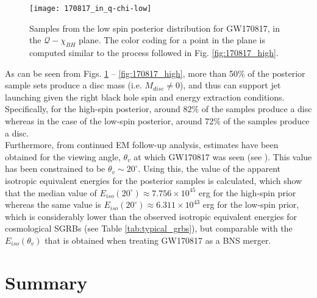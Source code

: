         \begin{figure}[ht]
            \centering
            \texttt{[image: 170817\_in\_q-chi-low]}
            \caption[$M_{disc}$ for GW170817's Low Spin Posterior Distribution]
            {
                Samples from the low spin posterior distribution for GW170817, in the
                $\mathcal{Q}-\chi_{BH}$ plane. The color coding for a point in the plane
                is computed similar to the process followed in Fig.
                \ref{fig:170817_high}.
            }
            \label{fig:170817_low}
        \end{figure}

    As can be seen from Figs. \ref{fig:170817_low} -- \ref{fig:170817_high}, more than
    50\% of the posterior sample sets produce a disc mass (i.e. $M_{disc} \neq 0$), and
    thus can support jet launching given the right black hole spin and energy extraction
    conditions. Specifically, for the high-spin posterior, around 82\% of the samples
    produce a disc whereas in the case of the low-spin posterior, around 72\% of the
    samples produce a disc.\\
    Furthermore, from continued EM follow-up analysis, estimates have been obtained for
    the viewing angle, $\theta_v$ at which GW170817 was seen (see \cite{finstad_2018}).
    This value has been constrained to be $\theta_v \sim 20^{\circ}$. Using this, the
    value of the apparent isotropic equivalent energies for the posterior samples is
    calculated, which show that the median value of $E_{iso}(20^{\circ}) \approx 7.756
    \times 10^{45}$ erg for the high-spin prior whereas the same value is
    $E_{iso}(20^{\circ}) \approx 6.311 \times 10^{43}$ erg for the low-spin prior, which
    is considerably lower than the observed isotropic equivalent energies for
    cosmological SGRBs (see Table \ref{tab:typical_grbs}), but comparable with the
    $E_{iso}(\theta_v)$ that is obtained when treating GW170817 as a BNS merger.

\section{Summary}

